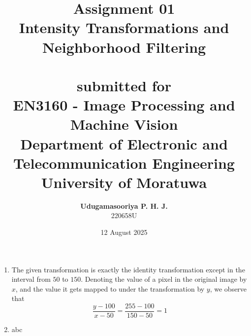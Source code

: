 \documentclass{article}[a4paper]
\title{
	\huge{\textbf{
		Assignment 01
	}}\\
	\Large{
		Intensity Transformations and Neighborhood Filtering
	}\\
	\phantom{}\\
	\large{
		submitted for
	}\\
	\LARGE{
		\textbf{EN3160 - Image Processing and Machine Vision}
	}\\
	\large{
		Department of Electronic and Telecommunication Engineering
	}
	\\
	\large{University of Moratuwa}
}
\author{
	\textbf{Udugamasooriya P. H. J.}\\
	220658U\\
}
\date{12 August 2025}
\begin{document}
\maketitle

\begin{enumerate}
	\item The given transformation is exactly the identity transformation except in the interval from $50$ to $150$. Denoting the
	value of a pixel in the original image by $x$, and the value it gets mapped to under the transformation by $y$, we observe that \[
		\dfrac{y - 100}{x - 50} = \dfrac{255 - 100}{150 - 50} = 1
	\]

	\item abc
\end{enumerate}
\end{document}
